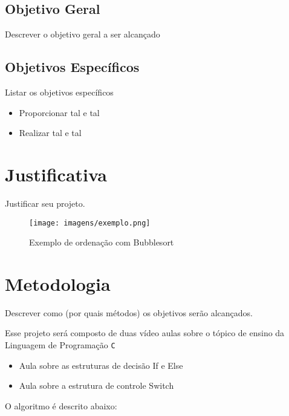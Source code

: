\documentclass[a4paper,10pt]{article}  %
\begin{document}
\subsection{Objetivo Geral}

Descrever o objetivo geral a ser alcançado

\subsection{Objetivos Específicos}

Listar os objetivos específicos

\begin{itemize}
 \item Proporcionar tal e tal
 \item Realizar tal e tal
\end{itemize}


\section{Justificativa}

Justificar seu projeto.

\begin{figure}[ht]
\centering
\texttt{[image: imagens/exemplo.png]}
\caption{Exemplo de ordenação com Bubblesort}
\label{fig:xsort}
\end{figure}


\section{Metodologia}

Descrever como (por quais métodos) os objetivos serão alcançados.

Esse projeto será composto de duas vídeo aulas sobre o tópico de ensino da Linguagem de Programação \texttt{C}

\begin{itemize}

 \item Aula sobre as estruturas de decisão If e Else
 \item Aula sobre a estrutura de controle Switch
\end{itemize}

O algoritmo é descrito abaixo:


\end{document}
